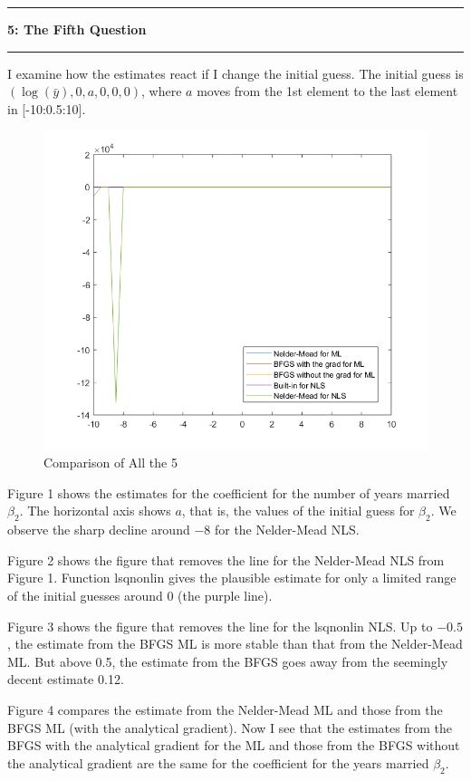 \documentclass[11pt]{article}
\newcommand\question[2]{\vspace{.25in}\hrule\textbf{#1: #2}\vspace{.5em}\hrule\vspace{.10in}}
\begin{document}
\question{5}{The Fifth Question}
I examine how the estimates react if I change the initial guess. The initial guess is $(\log(\bar{y}), 0, a, 0, 0, 0)$, where $a$ moves from the 1st element to the last element in [-10:0.5:10].\par
\begin{figure}
\includegraphics{all5.png}
\caption{Comparison of All the 5}
\end{figure}
Figure 1 shows the estimates for the coefficient for the number of years married $\beta_{2}$. The horizontal axis shows $a$, that is, the values of the initial guess for $\beta_{2}$. We observe the sharp decline around $-8$ for the Nelder-Mead NLS.\par
Figure 2 shows the figure that removes the line for the Nelder-Mead NLS from Figure 1. Function lsqnonlin gives the plausible estimate for only a limited range of the initial guesses around 0 (the purple line).\par
Figure 3 shows the figure that removes the line for the lsqnonlin NLS. Up to $-0.5$, the estimate from the BFGS ML is more stable than that from the Nelder-Mead ML. But above 0.5, the estimate from the BFGS goes away from the seemingly decent estimate 0.12.\par
Figure 4 compares the estimate from the Nelder-Mead ML and those from the BFGS ML (with the analytical gradient). Now I see that the estimates from the BFGS with the analytical gradient for the ML and those from the BFGS without the analytical gradient are the same for the coefficient for the years married $\beta_{2}$.\par
\end{document}
